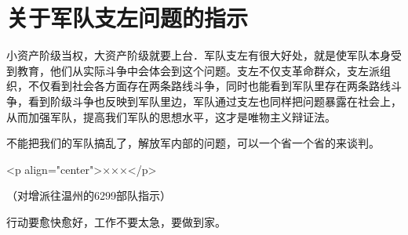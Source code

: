 \section[关于军队支左问题的指示（一九六七年八月）]{关于军队支左问题的指示}


小资产阶级当权，大资产阶级就要上台．军队支左有很大好处，就是使军队本身受到教育，他们从实际斗争中会体会到这个问题。支左不仅支革命群众，支左派组织，不仅看到社会各方面存在两条路线斗争，同时也能看到军队里存在两条路线斗争，看到阶级斗争也反映到军队里边，军队通过支左也同样把问题暴露在社会上，从而加强军队，提高我们军队的思想水平，这才是唯物主义辩证法。

不能把我们的军队搞乱了，解放军内部的问题，可以一个省一个省的来谈判。


<p align="center">×××</p>

（对增派往温州的6299部队指示）

行动要愈快愈好，工作不要太急，要做到家。


